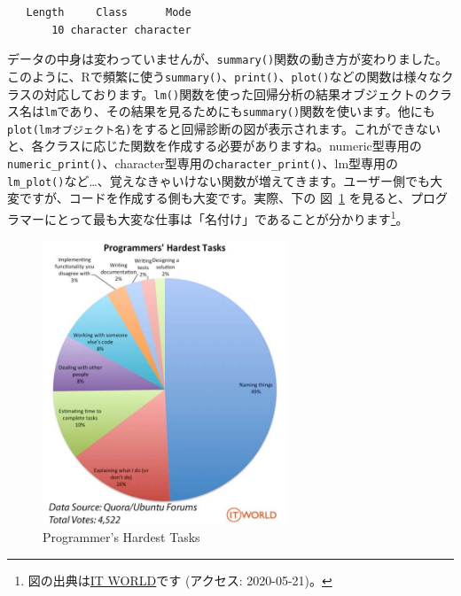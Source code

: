 \documentclass[
  a4paper,
  pandoc,
  ja=standard,
  jafont=haranoaji]{bxjsbook}
\begin{document}
\begin{verbatim}
   Length     Class      Mode 
       10 character character 
\end{verbatim}

データの中身は変わっていませんが、\texttt{summary()}関数の動き方が変わりました。このように、Rで頻繁に使う\texttt{summary()}、\texttt{print()}、\texttt{plot()}などの関数は様々なクラスの対応しております。\texttt{lm()}関数を使った回帰分析の結果オブジェクトのクラス名は\texttt{lm}であり、その結果を見るためにも\texttt{summary()}関数を使います。他にも\texttt{plot(lmオブジェクト名)}をすると回帰診断の図が表示されます。これができないと、各クラスに応じた関数を作成する必要がありますね。numeric型専用の\texttt{numeric\_print()}、character型専用の\texttt{character\_print()}、lm型専用の\texttt{lm\_plot()}など\ldots、覚えなきゃいけない関数が増えてきます。ユーザー側でも大変ですが、コードを作成する側も大変です。実際、下の
図~\ref{fig-oop_hardesttask}
を見ると、プログラマーにとって最も大変な仕事は「名付け」であることが分かります\footnote{図の出典は\href{https://www.itworld.com/article/2833265/don-t-go-into-programming-if-you-don-t-have-a-good-thesaurus.html}{IT
  WORLD}です (アクセス: 2020-05-21)。}。

\begin{figure}

{\centering \includegraphics[width=0.65\textwidth,height=\textheight]{./Figs/OOP/HardestTasks.jpg}

}

\caption{\label{fig-oop_hardesttask}Programmer's Hardest Tasks}

\end{figure}
\end{document}
